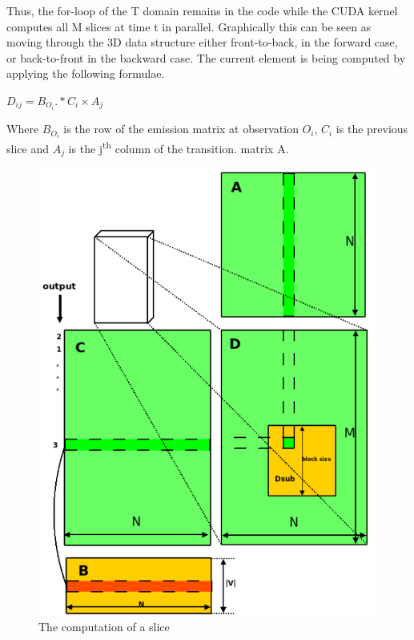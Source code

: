 \documentclass[english, paper=a4]{scrartcl}
\begin{document}
Thus, the for-loop of the T domain remains in the code while the CUDA kernel computes all M slices at time t in parallel. Graphically this can be seen as moving through the 3D data structure either front-to-back, in the forward case, or back-to-front in the backward case. The current element is being computed by applying the following formulae.

\begin{center}

\( D_{ij} = B_{O_i} .* C_i \times A_j \)

\end{center}

Where \( B_{O_i}\) is the row of the emission matrix at observation \(O_i\), \(C_i\) is the previous slice and \(A_j\) is the j\textsuperscript{th} column of the transition. matrix A.

\begin{figure}[H]
\centering

\includegraphics[scale=0.3]{"slice"}
  \caption{The computation of a slice\cite{cuhmm}}
\end{figure}
\end{document}
